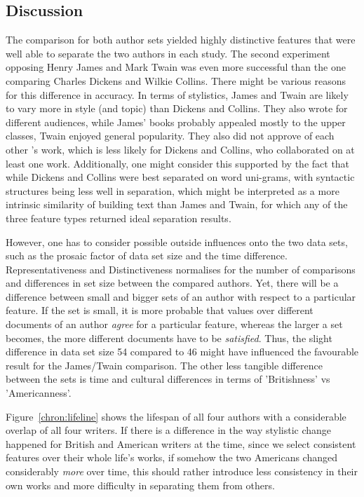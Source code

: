 \documentclass[a4paper,10pt,twoside,fleqn]{article}
\begin{document}
\subsection{Discussion}
The comparison for  both author sets yielded highly distinctive features
that were well able to separate the two authors in each study. 
The second experiment opposing Henry James and Mark Twain was 
even more successful than the one comparing Charles Dickens and Wilkie Collins.
There might be various reasons for this difference in accuracy. 
In terms of stylistics, James and Twain are likely to vary more
in style (and topic) than Dickens and Collins. 
They also wrote for different audiences, while James' books probably
appealed mostly to the upper classes, Twain enjoyed general 
popularity. They also did not approve of each other 's work, which
is less likely for Dickens and Collins, who collaborated
on at least one work. 
Additionally, one might consider this supported by the fact that 
while Dickens and Collins were best separated on word uni-grams, 
with syntactic structures being less well in separation, which 
might be interpreted as a more intrinsic similarity of building
text than James and Twain, for which any of the three feature types
returned ideal separation results. 

However, one has to consider possible outside influences 
onto the two data sets, such as the prosaic factor of data set size
and the time difference. 
Representativeness and Distinctiveness normalises for the number of 
comparisons and differences in set size between the compared authors.
Yet, there will be a difference between small and bigger sets of an 
author with respect to a particular feature. If the set is small, 
it is more probable that values over different documents of 
an author \emph{agree} for a particular feature, whereas the 
larger a set becomes, the more different documents have to be 
\emph{satisfied}. 
Thus, the slight difference in data set size 54 compared to 46
might have influenced the favourable result for the James/Twain
comparison. 
The other less tangible difference between the sets is time and
cultural differences in terms of 'Britishness' vs 'Americanness'.

Figure~\ref{chron:lifeline} shows the lifespan of all four authors
with a considerable overlap of all four writers. 
If there is a difference in the way stylistic change happened 
for British and American writers at the time, since
we select consistent features over their whole life's works, 
if somehow the two Americans changed considerably \emph{more}
over time, this should rather introduce less consistency in 
their own works and more difficulty in separating them from others. 
\end{document}
